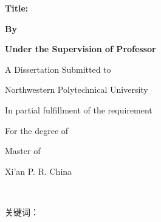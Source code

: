 {\begin{titlepage}
    \newpage
    \thispagestyle{empty}
    \begin{center}
      \vspace*{1.20cm} {\erhao\bf Title:~\sanhao\@etitle}

      \vspace*{2.30cm} {\xiaosan\bf By}

      \vspace*{0.15cm} {\xiaosan\bf \@eauthor}

      \vspace*{0.70cm} {\xiaosan\bf Under the Supervision of Professor}

      \vspace*{0.15cm} {\xiaosan\bf \@esupervisor}

      \vspace*{3.00cm} {\xiaosan A Dissertation Submitted to}

      \vspace*{0.15cm} {\xiaosan Northwestern Polytechnical University}

      \vspace*{0.90cm} {\xiaosan In partial fulfillment of the requirement}

      \vspace*{0.15cm} {\xiaosan For the degree of}

      \vspace*{0.15cm} {\xiaosan Master of \bf \xueke}

      \vspace*{2.90cm} {\xiaosan Xi'an P. R. China}

      \vspace*{0.14cm} {\xiaosan \@edate}
    \end{center}
    \end{titlepage}

  \ifxueweidoctor
    \newpage
    ~~~\vspace{1em}
    \thispagestyle{empty}
  \fi
\clearpage


\setcounter{page}{1}
\song{}
\@cabstract
\vspace{\baselineskip}

\hangindent=52.3pt%
{\hei\xiaosi 关键词：} {\@ckeywords}

}
